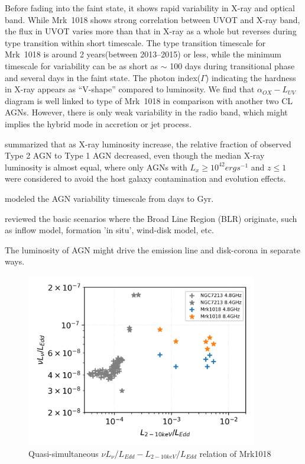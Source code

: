 Before fading into the faint state, it shows rapid variability in X-ray and optical band. While Mrk~1018 shows strong correlation between UVOT and X-ray band, the flux in UVOT varies more than that in X-ray as a whole but reverses during type transition within short timescale. The type transition timescale for Mrk~1018 is around 2 years(between 2013--2015) or less, while the minimum timescale for variability can be as short as $\sim$ 100 days during transitional phase and several days in the faint state. The photon index($\Gamma$) indicating the hardness in X-ray appears as ``V-shape'' compared to luminosity. We find that $\alpha_{OX}-L_{UV}$ diagram is well linked to type of Mrk~1018 in comparison with another two CL AGNs. However, there is only weak variability in the radio band, which might implies the hybrid mode in accretion or jet process.



\citet{2017ApJ...841L..18M} summarized that as X-ray luminosity increase, the relative fraction of observed Type 2 AGN to Type 1 AGN decreased, even though the median X-ray luminosity is almost equal, where only AGNs with $L_x \geq 10^{42} erg s^{-1}$ and $z \leq 1$ were considered to avoid the host galaxy contamination and evolution effects.

\citet{2018MNRAS.476L..34S} modeled the AGN variability timescale from days to Gyr.

\citet{2019arXiv190800742C} reviewed the basic scenarios where the Broad Line Region (BLR) originate, such as inflow model, formation 'in situ', wind-disk model, etc. 


The luminosity of AGN might drive the emission line and disk-corona in separate ways.



\begin{figure}
\centering
	\includegraphics[width=0.9\textwidth]{./pic/Mrk1018_ngc7213_radio_xray_rate.png}
    \caption{Quasi-simultaneous $\nu L_{\nu}/L_{Edd}-L_{2-10keV}/L_{Edd}$ relation of Mrk1018}
    \label{fig:radio-xray-rate_relation_plus_ngc7213}
\end{figure}


